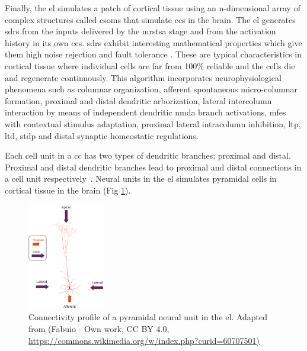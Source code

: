 \documentclass[10pt,journal,compsoc]{IEEEtran}
\begin{document}
Finally, the \gls{el} simulates a patch of cortical tissue using an n-dimensional array of complex structures called \glspl{csom} that simulate \glspl{cc} in the brain. The \gls{el} generates \glspl{sdr} \cite{ahmad_2016} from the inputs delivered by the \gls{mrstsa} stage and from the activation history in its own \glspl{cc}. \glspl{sdr} exhibit interesting mathematical properties which give them high noise rejection and fault tolerance \cite{DBLP:journals/corr/AhmadH15}. These are typical characteristics in cortical tissue where individual cells are far from 100\% reliable and the cells die and regenerate continuously. This algorithm incorporates neurophysiological phenomena such as columnar organization, afferent spontaneous micro-columnar formation, proximal and distal dendritic arborization, lateral intercolumn interaction by means of independent dendritic \gls{nmda} branch activations, \glspl{mfe} with contextual stimulus adaptation, proximal lateral intracolumn inhibition, \gls{ltp}, \gls{ltd}, \gls{stdp} and distal synaptic homeostatic regulations.

Each cell unit in a \gls{cc} has two types of dendritic branches; proximal and distal. Proximal and distal dendritic branches lead to proximal and distal connections in a cell unit respectively~\cite{Dematties2018}. Neural units in the \gls{el} simulates pyramidal cells in cortical tissue in the brain (Fig \ref{fig:Pyramidal_Cell}). 

\begin{figure}[h!]
    \centering
    \includegraphics[width=0.3\textwidth]{Pyramidal_Cell.png}
    \caption{Connectivity profile of a pyramidal neural unit in the \gls{el}. Adapted from (Fabuio - Own work, CC BY 4.0, \protect\url{https://commons.wikimedia.org/w/index.php?curid=60707501)}}
    \label{fig:Pyramidal_Cell}
\end{figure}
\end{document}

